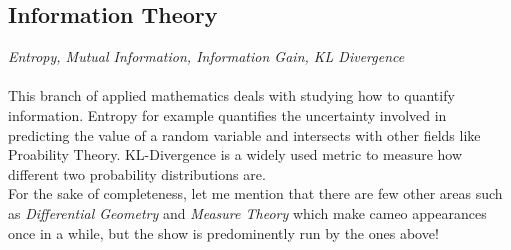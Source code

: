 \documentclass[a4paper]{article}
\begin{document}
\subsection{Information Theory}
\textit{Entropy, Mutual Information, Information Gain, KL Divergence} \\ \\
This branch of applied mathematics deals with studying how to quantify information. Entropy for example quantifies the uncertainty involved in predicting the value of a random variable and intersects with other fields like Proability Theory. KL-Divergence is a widely used metric to measure how different two probability distributions are. \\

\noindent For the sake of completeness, let me mention that there are few other areas such as {\it Differential Geometry} and {\it Measure Theory} which make cameo appearances once in a while, but the show is predominently run by the ones above!



\end{document}
